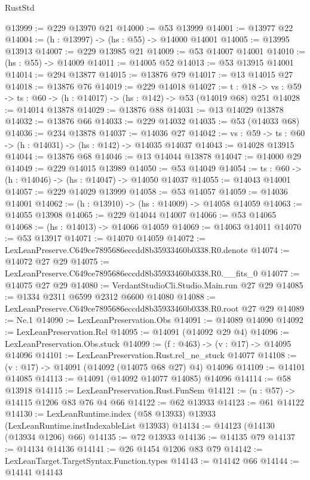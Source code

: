 \begin{lexlean}{RustStd}
\begin{coremodule}
@13999 := @229 @13970 @21
@14000 := @53 @13999
@14001 := @13977 @22
@14004 := (h : @13997) -> (hs : @55) -> @14000 @14001
@14005 := @13995 @13913
@14007 := @229 @13985 @21
@14009 := @53 @14007 @14001
@14010 := (hs : @55) -> @14009
@14011 := @14005 @52
@14013 := @53 @13915 @14001
@14014 := @294 @13877
@14015 := @13876 @79
@14017 := @13 @14015 @27
@14018 := @13876 @76
@14019 := @229 @14018
@14027 := {t : @18} ->
  {vs : @59} -> {ts : @60} -> (h : @14017) -> (hs : @142) -> @53 (@14019 @68) @251
@14028 := @14014 @13878
@14029 := @13876 @88
@14031 := @13 @14029 @13878
@14032 := @13876 @66
@14033 := @229 @14032
@14035 := @53 (@14033 @68)
@14036 := @234 @13878
@14037 := @14036 @27
@14042 := {vs : @59} -> {ts : @60} -> (h : @14031) -> (hs : @142) -> @14035 @14037
@14043 := @14028 @13915
@14044 := @13876 @68
@14046 := @13 @14044 @13878
@14047 := @14000 @29
@14049 := @229 @14015 @13989
@14050 := @53 @14049
@14054 := {ts : @60} -> (h : @14046) -> (hs : @14047) -> @14050 @14037
@14055 := @14043 @14001
@14057 := @229 @14029 @13999
@14058 := @53 @14057
@14059 := @14036 @14001
@14062 := (h : @13910) -> (hs : @14009) -> @14058 @14059
@14063 := @14055 @13908
@14065 := @229 @14044 @14007
@14066 := @53 @14065
@14068 := (hs : @14013) -> @14066 @14059
@14069 := @14063 @14011
@14070 := @53 @13917
@14071 := @14070 @14059
@14072 := LexLeanPreserve.C649ce7895686eccdd8b35933460b0338.R0.denote
@14074 := @14072 @27 @29
@14075 := LexLeanPreserve.C649ce7895686eccdd8b35933460b0338.R0.__fits_0
@14077 := @14075 @27 @29
@14080 := VerdantStudioCli.Studio.Main.run @27 @29
@14085 := @1334 @2311 @6599 @2312 @6600 @14080
@14088 := LexLeanPreserve.C649ce7895686eccdd8b35933460b0338.R0.root @27 @29
@14089 := Ne.{1}
@14090 := LexLeanPreservation.Obs
@14091 := @14089 @14090
@14092 := LexLeanPreservation.Rel
@14095 := @14091 (@14092 @29 @4)
@14096 := LexLeanPreservation.Obs.stuck
@14099 := (f : @463) -> (v : @17) -> @14095 @14096
@14101 := LexLeanPreservation.Rust.rel_ne_stuck @14077
@14108 := (v : @17) -> @14091 (@14092 (@14075 @68 @27) @4) @14096
@14109 := @14101 @14085
@14113 := @14091 (@14092 @14077 @14085) @14096
@14114 := @58 @13918
@14115 := LexLeanPreservation.Rust.FunSem
@14121 := (n : @57) -> @14115 @1206 @83 @76 @4 @66
@14122 := @62 @13933
@14123 := @61 @14122
@14130 := LexLeanRuntime.index (@58 @13933) @13933 (LexLeanRuntime.instIndexableList @13933)
@14134 := @14123 (@14130 (@13934 @1206) @66)
@14135 := @72 @13933
@14136 := @14135 @79
@14137 := @14134 @14136
@14141 := @26 @1454 @1206 @83 @79
@14142 := LexLeanTarget.TargetSyntax.Function.types
@14143 := @14142 @66
@14144 := @14141 @14143

\end{coremodule}
\end{lexlean}
